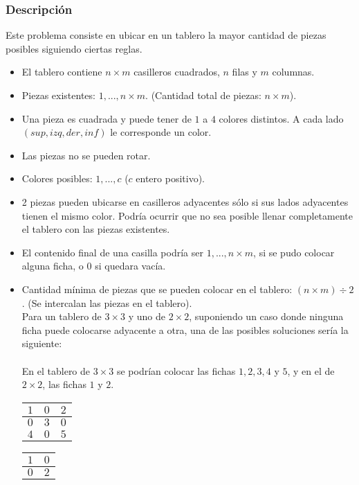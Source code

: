 \documentclass[11pt, a4paper, twoside]{article}
\begin{document}
{}

\subsubsection{Descripción}

Este problema consiste en ubicar en un tablero la mayor cantidad de piezas posibles siguiendo ciertas reglas.  

\begin{itemize}
\item El tablero contiene $n \times m$ casilleros cuadrados, $n$ filas y $m$ columnas. 
\item Piezas existentes: $1,...,n \times m$. (Cantidad total de piezas: $n \times m$).     
\item Una pieza es cuadrada y puede tener de $1$ a $4$ colores distintos. A cada lado $(sup, izq, der, inf)$ le corresponde un color. 
\item Las piezas no se pueden rotar.
\item Colores posibles: $1,...,c$ ($c$ entero positivo). 
\item 2 piezas pueden ubicarse en casilleros adyacentes sólo si sus lados adyacentes tienen el mismo color. Podría ocurrir que no sea posible llenar completamente el tablero con las piezas existentes. 
\item El contenido final de una casilla podría ser $1,...,n \times m$, si se pudo colocar alguna ficha, o $0$ si quedara vacía. 
\item Cantidad mínima de piezas que se pueden colocar en el tablero: $(n \times m)\div 2$. (Se intercalan las piezas en el tablero). \\
Para un tablero de $3\times 3$ y uno de $2\times 2$, suponiendo un caso donde ninguna ficha puede colocarse adyacente a otra, una de las posibles soluciones sería la siguiente: \\
\\
En el tablero de $3\times 3$ se podrían colocar las fichas $1,2,3,4$ y $5$, y en el de $2\times 2$, las fichas $1$ y $2$.  \\

\begin{minipage}{0.2\textwidth}
	\begin{tabular}{|c|c|c|}
		\hline
		 $1$ & $0$ & $2$ \\
		\hline
		 $0$ & $3$ & $0$  \\
		\hline 
		 $4$ & $0$ & $5$ \\
		\hline
	\end{tabular}
\end{minipage}
\begin{minipage}{0.2\textwidth}
	\begin{tabular}{|c|c|}
		\hline
		 $1$ & $0$ \\
		\hline
		 $0$ & $2$ \\
		\hline
	\end{tabular}
\end{minipage}

\end{itemize} 
\end{document}
